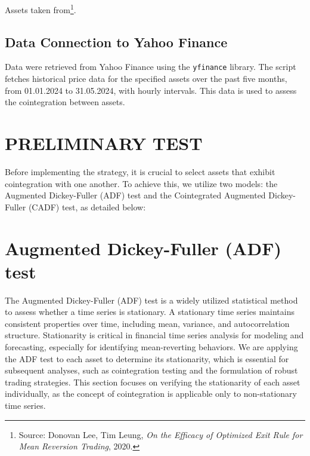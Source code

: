 \documentclass{article}
\begin{document}
Assets taken from\footnote{Source: Donovan Lee, Tim Leung, \textit{On the Efficacy of Optimized Exit Rule for Mean Reversion Trading}, 2020.}.

\subsection*{Data Connection to Yahoo Finance}
Data were retrieved from Yahoo Finance using the \texttt{yfinance} library. The script fetches historical price data for the specified assets over the past five months, from 01.01.2024 to 31.05.2024, with hourly intervals. This data is used to assess the cointegration between assets.
\clearpage










\section{PRELIMINARY TEST}
Before implementing the strategy, it is crucial to select assets that exhibit cointegration with one another. To achieve this, we utilize two models: the Augmented Dickey-Fuller (ADF) test and the Cointegrated Augmented Dickey-Fuller (CADF) test, as detailed below:

\section*{Augmented Dickey-Fuller (ADF) test}
The Augmented Dickey-Fuller (ADF) test is a widely utilized statistical method to assess whether a time series is stationary. A stationary time series maintains consistent properties over time, including mean, variance, and autocorrelation structure. Stationarity is critical in financial time series analysis for modeling and forecasting, especially for identifying mean-reverting behaviors.
We are applying the ADF test to each asset to determine its stationarity, which is essential for subsequent analyses, such as cointegration testing and the formulation of robust trading strategies. This section focuses on verifying the stationarity of each asset individually, as the concept of cointegration is applicable only to non-stationary time series.
\end{document}
